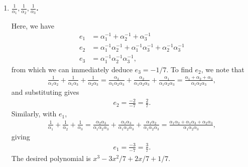 \documentclass[12pt]{article}
\begin{document}
\begin{enumerate}
\begin{enumerate}
            \item
                \boldmath\textbf{$\frac{1}{\alpha_1}, \frac{1}{\alpha_2}, \frac{1}{\alpha_3}$.
                }\unboldmath \par
                Here, we have
                \begin{align*}
                    e_1 &= \alpha_1^{-1} + \alpha_2^{-1} + \alpha_3^{-1} \\
                    e_2 &= \alpha_1^{-1}\alpha_2^{-1} + \alpha_1^{-1}\alpha_3^{-1} + \alpha_2^{-1}\alpha_3^{-1} \\
                    e_3 &= \alpha_1^{-1}\alpha_2^{-1}\alpha_3^{-1},
                \end{align*}
                from which we can immediately deduce $e_3 = -1/7$. To find $e_2$, we note that
                \begin{align*}
                    \frac{1}{\alpha_1\alpha_2} + \frac{1}{\alpha_1\alpha_3} + \frac{1}{\alpha_2\alpha_3} = \frac{\alpha_3}{\alpha_1\alpha_2\alpha_3} + \frac{\alpha_2}{\alpha_1\alpha_2\alpha_3} + \frac{\alpha_1}{\alpha_1\alpha_2\alpha_3} = \frac{\alpha_1 + \alpha_2 + \alpha_3}{\alpha_1\alpha_2\alpha_3},
                \end{align*}
                and substituting gives
                \begin{align*}
                    e_2 = \frac{-2}{-7} = \frac{2}{7}.
                \end{align*}
                Similarly, with $e_1$,
                \begin{align*}
                    \frac{1}{\alpha_1} + \frac{1}{\alpha_2} + \frac{1}{\alpha_3} = \frac{\alpha_2\alpha_3}{\alpha_1\alpha_2\alpha_3} + \frac{\alpha_1\alpha_3}{\alpha_1\alpha_2\alpha_3} + \frac{\alpha_1\alpha_2}{\alpha_1\alpha_2\alpha_3} = \frac{\alpha_1\alpha_2 + \alpha_1\alpha_3 + \alpha_2\alpha_3}{\alpha_1\alpha_2\alpha_3},
                \end{align*}
                giving
                \begin{align*}
                    e_1 = \frac{-3}{-7} = \frac{3}{7}.
                \end{align*}
                The desired polynomial is $x^3 - 3x^2/7 + 2x/7 + 1/7$.


\end{enumerate}
\end{enumerate}
\end{document}
